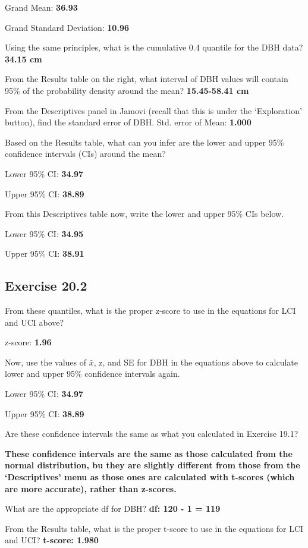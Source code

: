 \documentclass[
]{scrbook}
\begin{document}
Grand Mean: \textbf{36.93}

Grand Standard Deviation: \textbf{10.96}

Using the same principles, what is the cumulative 0.4 quantile for the DBH data? \textbf{34.15 cm}

From the Results table on the right, what interval of DBH values will contain 95\% of the probability density around the mean? \textbf{15.45-58.41 cm}

From the Descriptives panel in Jamovi (recall that this is under the `Exploration'
button), find the standard error of DBH. Std. error of Mean: \textbf{1.000}

Based on the Results table, what can you infer are the lower and upper 95\%
confidence intervals (CIs) around the mean?

Lower 95\% CI: \textbf{34.97}

Upper 95\% CI: \textbf{38.89}

From this Descriptives table now, write the lower and upper 95\% CIs below.

Lower 95\% CI: \textbf{34.95}

Upper 95\% CI: \textbf{38.91}

\hypertarget{exercise-20.2}{%
\subsection{Exercise 20.2}\label{exercise-20.2}}

From these quantiles, what is the proper z-score to use in the equations for LCI
and UCI above?

z-score: \textbf{1.96}

Now, use the values of \(\bar{x}\), z, and SE for DBH in the equations above to calculate lower and upper 95\% confidence intervals again.

Lower 95\% CI: \textbf{34.97}

Upper 95\% CI: \textbf{38.89}

Are these confidence intervals the same as what you calculated in Exercise 19.1?

\textbf{These confidence intervals are the same as those calculated from the normal distribution, bu they are slightly different from those from the `Descriptives' menu as those ones are calculated with t-scores (which are more accurate), rather than z-scores.}

What are the appropriate df for DBH? \textbf{df: 120 - 1 = 119}

From the Results table, what is the proper t-score to use in the equations for LCI and UCI? \textbf{t-score: 1.980}
\end{document}
